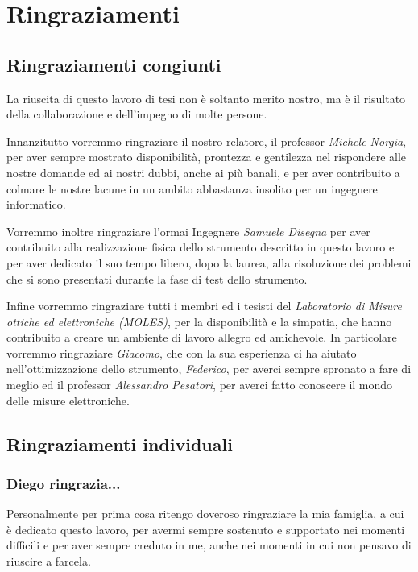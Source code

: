 \chapter*{Ringraziamenti}
\label{ringraziamenti}
\thispagestyle{empty}

\section*{Ringraziamenti congiunti}
La riuscita di questo lavoro di tesi non è soltanto merito nostro, ma è il risultato della collaborazione e dell'impegno di molte persone.

Innanzitutto vorremmo ringraziare il nostro relatore, il professor \textit{Michele Norgia}, per aver sempre mostrato disponibilità, prontezza e gentilezza nel rispondere alle nostre domande ed ai nostri dubbi, anche ai più banali, e per aver contribuito a colmare le nostre lacune in un ambito abbastanza insolito per un ingegnere informatico.

Vorremmo inoltre ringraziare l'ormai Ingegnere \textit{Samuele Disegna} per aver contribuito alla realizzazione fisica dello strumento descritto in questo lavoro e per aver dedicato il suo tempo libero, dopo la laurea, alla risoluzione dei problemi che si sono presentati durante la fase di test dello strumento.

Infine vorremmo ringraziare tutti i membri ed i tesisti del \textit{Laboratorio di Misure ottiche ed elettroniche (MOLES)}, per la disponibilità e la simpatia, che hanno contribuito a creare un ambiente di lavoro allegro ed amichevole. In particolare vorremmo ringraziare \textit{Giacomo}, che con la sua esperienza ci ha aiutato nell'ottimizzazione dello strumento, \textit{Federico}, per averci sempre spronato a fare di meglio ed il professor \textit{Alessandro Pesatori}, per averci fatto conoscere il mondo delle misure elettroniche.

\section*{Ringraziamenti individuali}
\subsection*{Diego ringrazia...}

Personalmente per prima cosa ritengo doveroso ringraziare la mia famiglia, a cui è dedicato questo lavoro, per avermi sempre sostenuto e supportato nei momenti difficili e per aver sempre creduto in me, anche nei momenti in cui non pensavo di riuscire a farcela.

